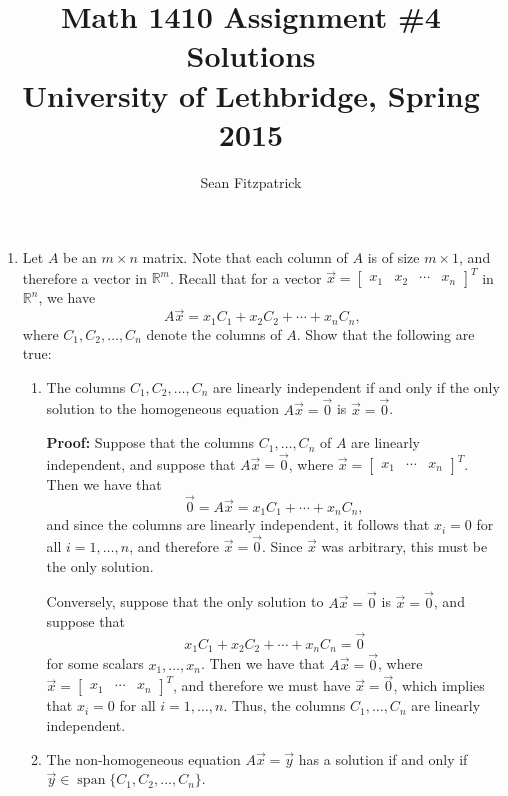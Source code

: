 \documentclass[letterpaper,12pt]{article}
\title{Math 1410 Assignment \#4 Solutions\\University of Lethbridge, Spring 2015}
\author{Sean Fitzpatrick}
\newcommand{\R}{\mathbb{R}}
\begin{document}
 \maketitle

\begin{enumerate}
\item Let $A$ be an $m\times n$ matrix. Note that each column of $A$ is of size $m\times 1$, and therefore a vector in $\R^m$. Recall that for a vector $\vec{x} = \begin{bmatrix}x_1&x_2&\cdots &x_n\end{bmatrix}^T$ in $\R^n$, we have
\[
 A\vec{x} = x_1C_1+x_2C_2+\cdots +x_nC_n,
\]
where $C_1,C_2,\ldots, C_n$ denote the columns of $A$. Show that the following are true:
\begin{enumerate}
 \item The columns $C_1,C_2,\ldots, C_n$ are linearly independent if and only if the only solution to the homogeneous equation $A\vec{x}=\vec{0}$ is $\vec{x}=\vec{0}$.

\bigskip

{\bf Proof:} Suppose that the columns $C_1,\ldots, C_n$ of $A$ are linearly independent, and suppose that $A\vec{x} = \vec{0}$, where $\vec{x} = \begin{bmatrix}x_1&\cdots&x_n\end{bmatrix}^T$. Then we have that
\[
 \vec{0}= A\vec{x} = x_1C_1+\cdots +x_nC_n,
\]
and since the columns are linearly independent, it follows that $x_i=0$ for all $i=1,\ldots, n$, and therefore $\vec{x}=\vec{0}$. Since $\vec{x}$ was arbitrary, this must be the only solution.

Conversely, suppose that the only solution to $A\vec{x}=\vec{0}$ is $\vec{x}=\vec{0}$, and suppose that
\[
 x_1C_1+x_2C_2+\cdots + x_nC_n = \vec{0}
\]
for some scalars $x_1,\ldots, x_n$. Then we have that $A\vec{x}=\vec{0}$, where $\vec{x} = \begin{bmatrix}x_1&\cdots & x_n\end{bmatrix}^T$, and therefore we must have $\vec{x}=\vec{0}$, which implies that $x_i=0$ for all $i=1,\ldots, n$. Thus, the columns $C_1,\ldots, C_n$ are linearly independent.

\bigskip

 \item The non-homogeneous equation $A\vec{x}=\vec{y}$ has a solution if and only if\\ $\vec{y}\in\operatorname{span}\{C_1,C_2,\ldots, C_n\}$.

\bigskip


\end{enumerate}
\end{enumerate}
\end{document}
